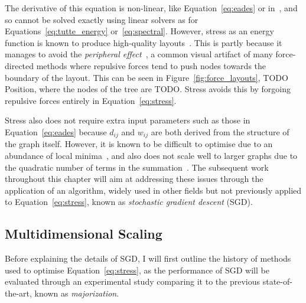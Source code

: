 The derivative of this equation is non-linear, like Equation~\eqref{eq:eades} or in~\cite{Fruchterman1991, Frick1995}, and so cannot be solved exactly using linear solvers as for Equations~\eqref{eq:tutte_energy} or~\eqref{eq:spectral}.
However, stress as an energy function is known to produce high-quality layouts~\cite{Brandes2009}. This is partly because it manages to avoid the \emph{peripheral effect}~\cite{Hu2005}, a common visual artifact of many force-directed methods where repulsive forces tend to push nodes towards the boundary of the layout. This can be seen in Figure~\ref{fig:force_layouts}, TODO Position, where the nodes of the tree are TODO. Stress avoids this by forgoing repulsive forces entirely in Equation~\eqref{eq:stress}.

Stress also does not require extra input parameters such as those in Equation~\eqref{eq:eades} because $d_{ij}$ and $w_{ij}$ are both derived from the structure of the graph itself.
However, it is known to be difficult to optimise due to an abundance of local minima~\cite{DeLeeuw1988, Gansner2005}, and also does not scale well to larger graphs due to the quadratic number of terms in the summation~\cite{Brandes2009, Hu2005}.
The subsequent work throughout this chapter will aim at addressing these issues through the application of an algorithm, widely used in other fields but not previously applied to Equation~\ref{eq:stress}, known as \emph{stochastic gradient descent} (SGD).


\subsection{Multidimensional Scaling}
\label{sec:stress_background}
Before explaining the details of SGD, I will first outline the history of methods used to optimise Equation~\eqref{eq:stress}, as the performance of SGD will be evaluated through an experimental study comparing it to the previous state-of-the-art, known as \emph{majorization}.

